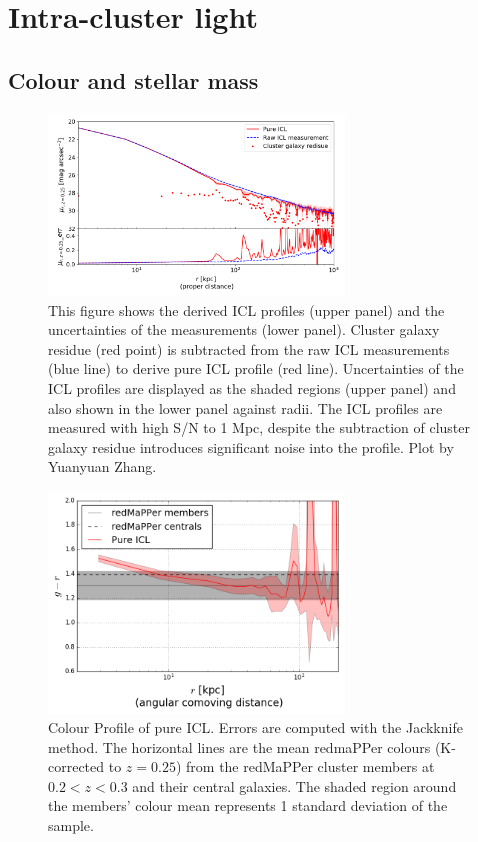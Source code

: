 {\section{Intra-cluster light}\label{sec:icl}

\subsection{Colour and stellar mass}
\begin{figure}\centering
\includegraphics[width=0.7\textwidth]{./chapters/chapter6/figs/icl.png}
\caption{This figure shows the derived ICL profiles (upper panel) and the uncertainties of the measurements (lower panel). Cluster galaxy residue (red point) is subtracted from the raw ICL measurements (blue line) to derive pure ICL profile (red line). Uncertainties of the ICL profiles are displayed as the shaded regions (upper panel) and also shown in the lower panel against radii. The ICL profiles are measured with high S/N to 1 Mpc, despite the subtraction of cluster galaxy residue introduces significant noise into the profile. Plot by Yuanyuan Zhang.}
\label{fig:cluster_profile}
\end{figure}
\begin{figure}\centering
\includegraphics[width=0.7\textwidth]{./chapters/chapter6/figs/icl_color.png}
\caption{Colour Profile of pure ICL. Errors are computed with the Jackknife method. The horizontal lines are the mean redmaPPer colours (K-corrected to $z=0.25$) from the redMaPPer cluster members at $0.2<z<0.3$ and their central galaxies. The shaded region around the members' colour mean represents 1 standard deviation of the sample.}
\label{fig:color}
\end{figure}

}
